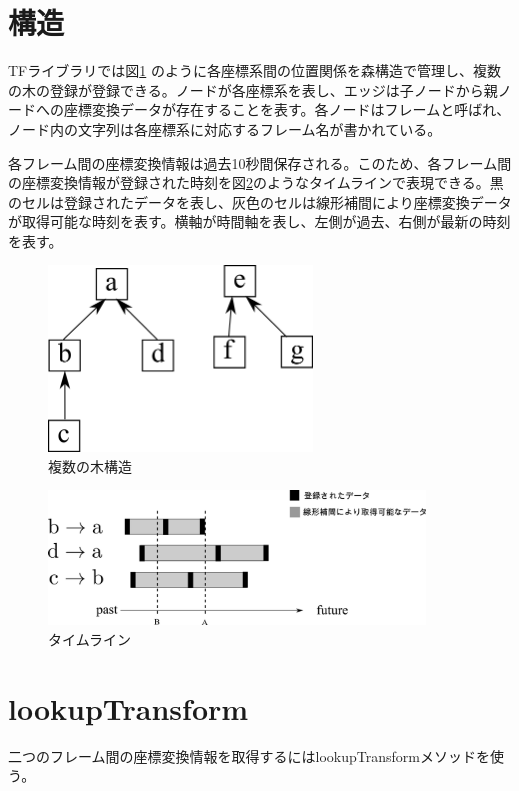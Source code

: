 \documentclass[a4paper]{jreport}	%
\begin{document}
\section{構造}
TFライブラリでは図\ref{fig:multitree} のように各座標系間の位置関係を森構造で管理し、複数の木の登録が登録できる。ノードが各座標系を表し、エッジは子ノードから親ノードへの座標変換データが存在することを表す。各ノードはフレームと呼ばれ、ノード内の文字列は各座標系に対応するフレーム名が書かれている。

各フレーム間の座標変換情報は過去10秒間保存される。このため、各フレーム間の座標変換情報が登録された時刻を図\ref{fig:general-timeline}のようなタイムラインで表現できる。黒のセルは登録されたデータを表し、灰色のセルは線形補間により座標変換データが取得可能な時刻を表す。横軸が時間軸を表し、左側が過去、右側が最新の時刻を表す。



\begin{figure}[h] 
\centering
\includegraphics[width=7cm]{multitree.png}	
\caption{複数の木構造}
\label{fig:multitree}
\end{figure}

\begin{figure}[h] 
\centering
\includegraphics[width=10cm]{general-timeline.png}
\caption{タイムライン}
\label{fig:general-timeline}
\end{figure}


\section{lookupTransform}
二つのフレーム間の座標変換情報を取得するにはlookupTransformメソッドを使う。
\end{document}
